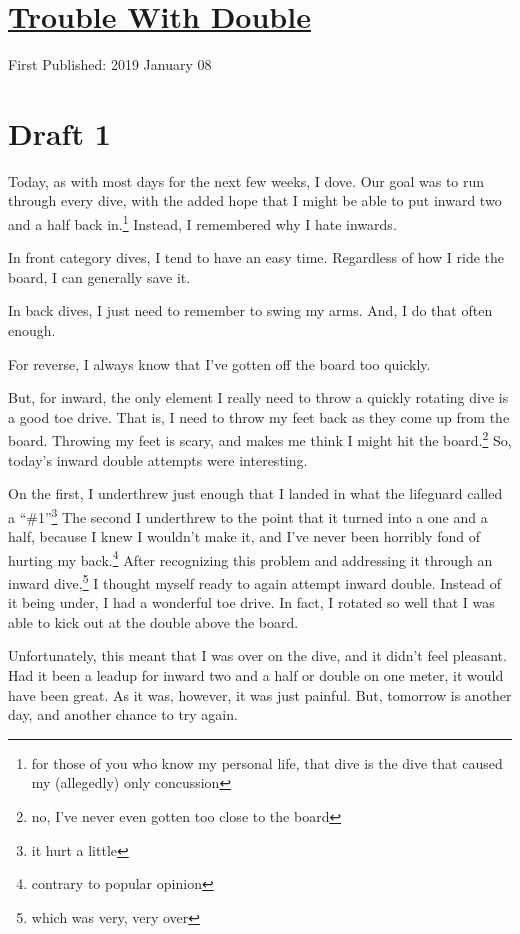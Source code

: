 \documentclass[12pt]{article}[titlepage]
\newcommand{\say}[1]{``\#1''}
\newcommand{\1}{\={a}}
\newcommand{\2}{\={e}}
\newcommand{\3}{\={\i}}
\newcommand{\4}{\=o}
\newcommand{\5}{\=u}
\newcommand{\6}{\={A}}
\renewcommand{\,}{\textsuperscript{,}}
\begin{document}
\doublespacing
\section{\href{trouble-with-double.html}{Trouble With Double}}
First Published: 2019 January 08
\section{Draft 1}
Today, as with most days for the next few weeks, I dove.
Our goal was to run through every dive, with the added hope that I might be able to put inward two and a half back in.\footnote{for those of you who know my personal life, that dive is the dive that caused my (allegedly) only concussion}
Instead, I remembered why I hate inwards.

In front category dives, I tend to have an easy time.
Regardless of how I ride the board, I can generally save it.

In back dives, I just need to remember to swing my arms.
And, I do that often enough.

For reverse, I always know that I've gotten off the board too quickly.

But, for inward, the only element I really need to throw a quickly rotating dive is a good toe drive.
That is, I need to throw my feet back as they come up from the board.
Throwing my feet is scary, and makes me think I might hit the board.\footnote{no, I've never even gotten too close to the board}
So, today's inward double attempts were interesting.

On the first, I underthrew just enough that I landed in what the lifeguard called a \say{perfect cannonball.}\footnote{it hurt a little}
The second I underthrew to the point that it turned into a one and a half, because I knew I wouldn't make it, and I've never been horribly fond of hurting my back.\footnote{contrary to popular opinion}
After recognizing this problem and addressing it through an inward dive,\footnote{which was very, very over} I thought myself ready to again attempt inward double.
Instead of it being under, I had a wonderful toe drive.
In fact, I rotated so well that I was able to kick out at the double above the board.

Unfortunately, this meant that I was over on the dive, and it didn't feel pleasant.
Had it been a leadup for inward two and a half or double on one meter, it would have been great.
As it was, however, it was just painful.
But, tomorrow is another day, and another chance to try again.
\end{document}
